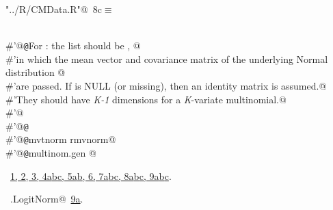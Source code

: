 \documentclass[reqno]{amsart}
\renewcommand{\NWtarget}[2]{\hypertarget{#1}{#2}}
\renewcommand{\NWlink}[2]{\hyperlink{#1}{#2}}
\begin{document}
\begin{flushleft} \small\label{scrap15}\raggedright\small
\NWtarget{nuweb8c}{} \verb@"../R/CMData.R"@\nobreak\ {\footnotesize {8c}}$\equiv$
\vspace{-1ex}
\begin{list}{}{} \item
\mbox{}\verb@@\\
\mbox{}\verb@#'@{\tt @}\verb@details For : the  list should be , @\\
\mbox{}\verb@#'in which the mean vector and covariance matrix of the underlying Normal distribution @\\
\mbox{}\verb@#'are passed. If  is NULL (or missing), then an identity matrix is assumed.@\\
\mbox{}\verb@#'They should have \emph{K-1} dimensions for a \emph{K}-variate multinomial.@\\
\mbox{}\verb@#'@\\
\mbox{}\verb@#'@{\tt @}\verb@export@\\
\mbox{}\verb@#'@{\tt @}\verb@importFrom mvtnorm rmvnorm@\\
\mbox{}\verb@#'@{\tt @}\verb@rdname multinom.gen @\\
\mbox{}\verb@@{\NWsep}
\end{list}
\vspace{-1.5ex}
\footnotesize
\begin{list}{}{\setlength{\itemsep}{-\parsep}\setlength{\itemindent}{-\leftmargin}}
\item \NWtxtFileDefBy\ \NWlink{nuweb1}{1}\NWlink{nuweb2}{, 2}\NWlink{nuweb3}{, 3}\NWlink{nuweb4a}{, 4a}\NWlink{nuweb4b}{b}\NWlink{nuweb4c}{c}\NWlink{nuweb5a}{, 5a}\NWlink{nuweb5b}{b}\NWlink{nuweb6}{, 6}\NWlink{nuweb7a}{, 7a}\NWlink{nuweb7b}{b}\NWlink{nuweb7c}{c}\NWlink{nuweb8a}{, 8a}\NWlink{nuweb8b}{b}\NWlink{nuweb8c}{c}\NWlink{nuweb9a}{, 9a}\NWlink{nuweb9b}{b}\NWlink{nuweb9c}{c}.
\item \NWtxtIdentsUsed\nobreak\  \verb@mg.LogitNorm@\nobreak\ \NWlink{nuweb9a}{9a}.
\item{}
\end{list}
\vspace{4ex}
\end{flushleft}
\end{document}
